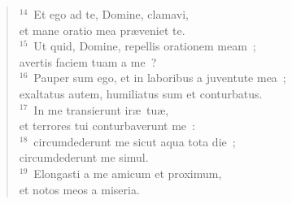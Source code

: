 \begin{flushleft}
\begin{verse}
${}^{14}$~Et ego ad te, Domine, clamavi,\\ et mane oratio mea pr\ae veniet te.\\
${}^{15}$~Ut quid, Domine, repellis orationem meam~;\\ avertis faciem tuam a me~?\\
${}^{16}$~Pauper sum ego, et in laboribus a juventute mea~;\\ exaltatus autem, humiliatus sum et conturbatus.\\
${}^{17}$~In me transierunt ir\ae\ tu\ae ,\\ et terrores tui conturbaverunt me~:\\
${}^{18}$~circumdederunt me sicut aqua tota die~;\\ circumdederunt me simul.\\
${}^{19}$~Elongasti a me amicum et proximum,\\ et notos meos a miseria.\end{verse}\end{flushleft}


